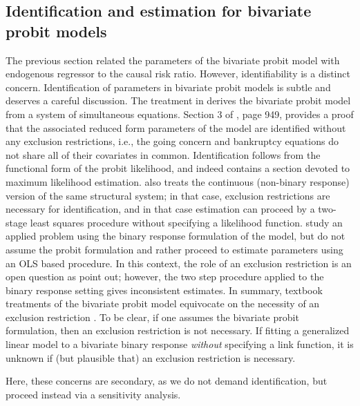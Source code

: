 \documentclass[aoas,preprint, 11pt, dvipsnames, table, x11name]{imsart}
\theoremstyle{remark}
\begin{document}
\subsection{Identification and estimation for bivariate probit models}\label{techremarks}
The previous section related the parameters of the bivariate probit model with endogenous regressor to the causal risk ratio. However, identifiability is a distinct concern. Identification of parameters in bivariate probit models is subtle and deserves a careful discussion. The treatment in \cite{Heckman-1978} derives the bivariate probit model from a system of simultaneous equations.  Section 3 of \cite{Heckman-1978}, page 949, provides a proof that the associated reduced form parameters of the model are identified without any exclusion restrictions, i.e., the going concern and bankruptcy equations do not share all of their covariates in common.  Identification follows from the functional form of the probit likelihood, and indeed \cite{Heckman-1978} contains a section devoted to maximum likelihood estimation.  \cite{Heckman-1978} also treats the continuous (non-binary response) version of the same structural system; in that case, exclusion restrictions are necessary for identification, and in that case estimation can proceed by a two-stage least squares procedure without specifying a likelihood function.  \cite{Evans-Schwab-1995} study an applied problem using the binary response formulation of the \cite{Heckman-1978} model, but do not assume the probit formulation and rather proceed to estimate parameters using an OLS based procedure.  In this context, the role of an exclusion restriction is an open question as  \cite{Altonji-Elder-Taber-2005} point out; however, the two step procedure applied to the binary response setting gives inconsistent estimates. In summary, textbook treatments of the bivariate probit model equivocate on the necessity of an exclusion restriction \citep[Chapter~15]{Wooldridge-2010}.  To be clear, if one assumes the bivariate probit formulation, then an exclusion restriction is not necessary.  If fitting a generalized linear model to a bivariate binary response {\em without} specifying a link function, it is unknown if (but plausible that) an exclusion restriction is necessary.

Here, these concerns are secondary, as we do not demand identification, but proceed instead via a sensitivity analysis.
\end{document}
